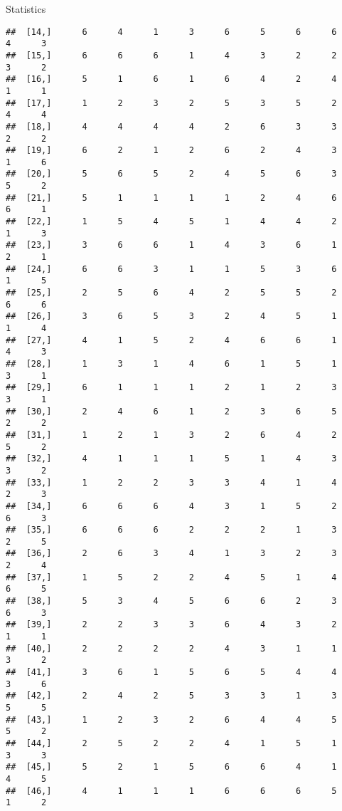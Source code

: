 \documentclass[
  ignorenonframetext,
]{beamer}
\begin{document}
\begin{frame}[fragile]{Statistics}
\begin{verbatim}
##  [14,]      6      4      1      3      6      5      6      6      4      3
##  [15,]      6      6      6      1      4      3      2      2      3      2
##  [16,]      5      1      6      1      6      4      2      4      1      1
##  [17,]      1      2      3      2      5      3      5      2      4      4
##  [18,]      4      4      4      4      2      6      3      3      2      2
##  [19,]      6      2      1      2      6      2      4      3      1      6
##  [20,]      5      6      5      2      4      5      6      3      5      2
##  [21,]      5      1      1      1      1      2      4      6      6      1
##  [22,]      1      5      4      5      1      4      4      2      1      3
##  [23,]      3      6      6      1      4      3      6      1      2      1
##  [24,]      6      6      3      1      1      5      3      6      1      5
##  [25,]      2      5      6      4      2      5      5      2      6      6
##  [26,]      3      6      5      3      2      4      5      1      1      4
##  [27,]      4      1      5      2      4      6      6      1      4      3
##  [28,]      1      3      1      4      6      1      5      1      3      1
##  [29,]      6      1      1      1      2      1      2      3      3      1
##  [30,]      2      4      6      1      2      3      6      5      2      2
##  [31,]      1      2      1      3      2      6      4      2      5      2
##  [32,]      4      1      1      1      5      1      4      3      3      2
##  [33,]      1      2      2      3      3      4      1      4      2      3
##  [34,]      6      6      6      4      3      1      5      2      6      3
##  [35,]      6      6      6      2      2      2      1      3      2      5
##  [36,]      2      6      3      4      1      3      2      3      2      4
##  [37,]      1      5      2      2      4      5      1      4      6      5
##  [38,]      5      3      4      5      6      6      2      3      6      3
##  [39,]      2      2      3      3      6      4      3      2      1      1
##  [40,]      2      2      2      2      4      3      1      1      3      2
##  [41,]      3      6      1      5      6      5      4      4      3      6
##  [42,]      2      4      2      5      3      3      1      3      5      5
##  [43,]      1      2      3      2      6      4      4      5      5      2
##  [44,]      2      5      2      2      4      1      5      1      3      3
##  [45,]      5      2      1      5      6      6      4      1      4      5
##  [46,]      4      1      1      1      6      6      6      5      1      2

\end{verbatim}
\end{frame}
\end{document}
